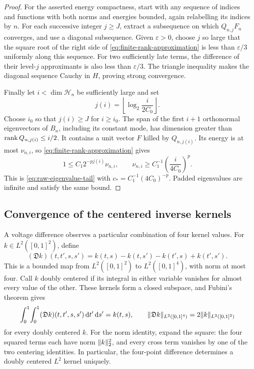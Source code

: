 \begin{proof}
For the asserted energy compactness, start with any sequence of indices
and functions with both norms and energies bounded, again relabelling its
indices by \(n\).  For each successive integer \(j\ge J\), extract a
subsequence on which \(Q_{n,j}F_n\) converges, and use a diagonal
subsequence.  Given \(\varepsilon>0\), choose \(j\) so large that the square
root of the right side of \eqref{eq:finite-rank-approximation} is less than
\(\varepsilon/3\) uniformly along this sequence.  For two sufficiently
late terms, the difference of their level-\(j\) approximants is also less
than \(\varepsilon/3\).  The triangle inequality makes the diagonal
sequence Cauchy in \(H\), proving strong convergence.

Finally let \(i<\dim \mathcal H_n\) be sufficiently large and set
\[
 j(i)=\left\lfloor\log_2\frac{i}{2C_0}\right\rfloor.
\]
Choose \(i_0\) so that \(j(i)\ge J\) for \(i\ge i_0\).  The span of the
first \(i+1\) orthonormal eigenvectors of \(B_n\), including its constant
mode, has dimension greater than \(\operatorname{rank} Q_{n,j(i)}\le i/2\).  It contains
a unit vector \(F\) killed by \(Q_{n,j(i)}\).  Its energy is at most
\(\nu_{n,i}\), so \eqref{eq:finite-rank-approximation} gives
\[
 1\le C_1 2^{-pj(i)}\nu_{n,i},\qquad
 \nu_{n,i}\ge C_1^{-1}\left(\frac{i}{4C_0}\right)^p.
\]
This is \eqref{eq:raw-eigenvalue-tail} with
\(c_*=C_1^{-1}(4C_0)^{-p}\).  Padded eigenvalues are infinite and satisfy
the same bound.
\end{proof}

\subsection{Convergence of the centered inverse kernels}

A voltage difference observes a particular combination of four kernel
values.  For \(k\in L^2([0,1]^2)\), define
\[
 (\mathfrak Dk)(t,t',s,s')
 =k(t,s)-k(t,s')-k(t',s)+k(t',s').
\]
This is a bounded map from \(L^2([0,1]^2)\) to \(L^2([0,1]^4)\), with norm
at most four.  Call \(k\) doubly centered if its integral in either variable
vanishes for almost every value of the other.  These kernels form a closed
subspace, and Fubini's theorem gives
\begin{equation}\label{eq:double-difference-injective}
 \int_0^1\!\int_0^1(\mathfrak Dk)(t,t',s,s')\,\mathrm d t'\,\mathrm d s'=k(t,s),
 \qquad \lVert \mathfrak Dk\rVert_{L^2([0,1]^4)}=2\lVert k\rVert_{L^2([0,1]^2)}
\end{equation}
for every doubly centered \(k\).  For the norm identity, expand the square:
the four squared terms each have norm \(\lVert k\rVert_2^2\), and every cross
term vanishes by one of the two centering identities.  In particular, the
four-point difference determines a doubly centered \(L^2\) kernel uniquely.


